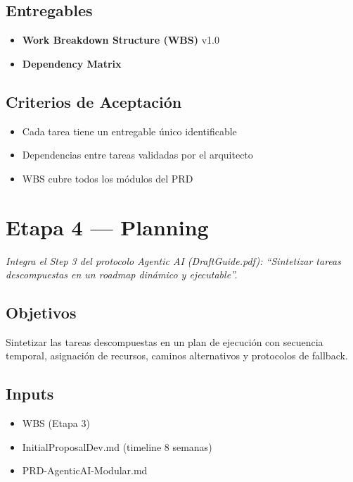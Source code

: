 \documentclass[12pt,a4paper]{article}
\begin{document}
\subsection*{Entregables}
\begin{itemize}
  \item \textbf{Work Breakdown Structure (WBS)} v1.0
  \item \textbf{Dependency Matrix}
\end{itemize}

\subsection*{Criterios de Aceptación}
\begin{itemize}
  \item[{${[\;]}$}] Cada tarea tiene un entregable único identificable
  \item[{${[\;]}$}] Dependencias entre tareas validadas por el arquitecto
  \item[{${[\;]}$}] WBS cubre todos los módulos del PRD
\end{itemize}

\section{Etapa 4 --- Planning}

\emph{Integra el Step 3 del protocolo Agentic AI (DraftGuide.pdf): ``Sintetizar tareas descompuestas en un roadmap dinámico y ejecutable''.}

\subsection*{Objetivos}
Sintetizar las tareas descompuestas en un plan de ejecución con secuencia temporal, asignación de recursos, caminos alternativos y protocolos de fallback.

\subsection*{Inputs}
\begin{itemize}
  \item WBS (Etapa 3)
  \item InitialProposalDev.md (timeline 8 semanas)
  \item PRD-AgenticAI-Modular.md
\end{itemize}
\end{document}
